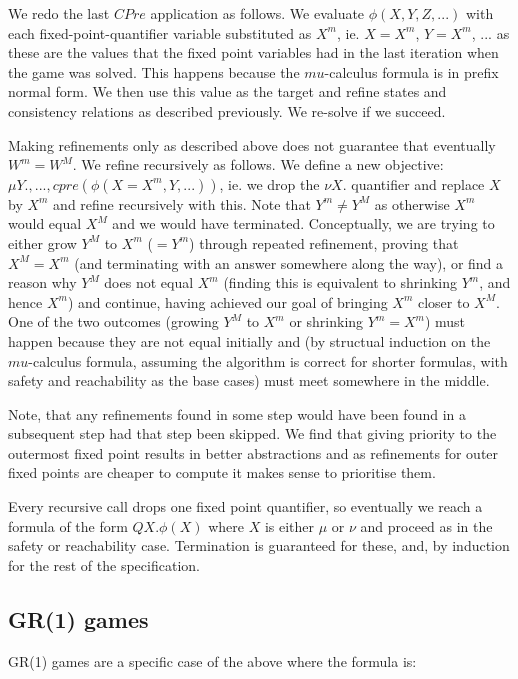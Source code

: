 \documentclass{book}
\theoremstyle{definition}
\begin{document}
We redo the last $CPre$ application as follows. We evaluate $\phi(X, Y, Z, ...)$ with each fixed-point-quantifier variable substituted as $X^m$, ie. $X=X^m$, $Y=X^m$, ... as these are the values that the fixed point variables had in the last iteration when the game was solved. This happens because the $mu$-calculus formula is in prefix normal form. We then use this value as the target and refine states and consistency relations as described previously. We re-solve if we succeed.

Making refinements only as described above does not guarantee that eventually $W^m = W^M$. We refine recursively as follows. We define a new objective: $\mu Y., ..., cpre(\phi(X=X^m, Y, ...))$, ie. we drop the $\nu X.$ quantifier and replace $X$ by $X^m$ and refine recursively with this. Note that $Y^m \neq Y^M$ as otherwise $X^m$ would equal $X^M$ and we would have terminated. Conceptually, we are trying to either grow $Y^M$ to $X^m$ ($=Y^m$) through repeated refinement, proving that $X^M = X^m$ (and terminating with an answer somewhere along the way), or find a reason why $Y^M$ does not equal $X^m$ (finding this is equivalent to shrinking $Y^m$, and hence $X^m$) and continue, having achieved our goal of bringing $X^m$ closer to $X^M$. One of the two outcomes (growing $Y^M$ to $X^m$ or shrinking $Y^m = X^m$) must happen because they are not equal initially and (by structual induction on the $mu$-calculus formula, assuming the algorithm is correct for shorter formulas, with safety and reachability as the base cases) must meet somewhere in the middle.

Note, that any refinements found in some step would have been found in a subsequent step had that step been skipped. We find that giving priority to the outermost fixed point results in better abstractions and as refinements for outer fixed points are cheaper to compute it makes sense to prioritise them.

Every recursive call drops one fixed point quantifier, so eventually we reach a formula of the form $Q X. \phi(X)$ where $X$ is either $\mu$ or $\nu$ and proceed as in the safety or reachability case. Termination is guaranteed for these, and, by induction for the rest of the specification.

\subsection{GR(1) games}

GR(1) games are a specific case of the above where the formula is:
\end{document}
